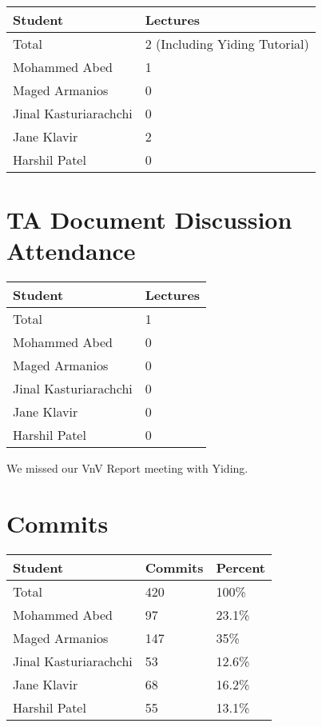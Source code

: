 \documentclass{article}
\begin{document}
\begin{table}[H]
\centering
\begin{tabular}{ll}
\toprule
\textbf{Student} & \textbf{Lectures}\\
\midrule
Total & 2 (Including Yiding Tutorial)\\
Mohammed Abed & 1\\
Maged Armanios & 0\\
Jinal Kasturiarachchi & 0\\
Jane Klavir & 2\\
Harshil Patel & 0\\
\bottomrule
\end{tabular}
\end{table}


\section{TA Document Discussion Attendance}


\begin{table}[H]
\centering
\begin{tabular}{ll}
\toprule
\textbf{Student} & \textbf{Lectures}\\
\midrule
Total & 1\\
Mohammed Abed & 0\\
Maged Armanios & 0\\
Jinal Kasturiarachchi & 0\\
Jane Klavir & 0\\
Harshil Patel & 0\\
\bottomrule
\end{tabular}
\end{table}

We missed our VnV Report meeting with Yiding.
\section{Commits}


\begin{table}[H]
\centering
\begin{tabular}{lll}
\toprule
\textbf{Student} & \textbf{Commits} & \textbf{Percent}\\
\midrule
Total & 420 & 100\% \\
Mohammed Abed & 97 & 23.1\% \\
Maged Armanios & 147 & 35\% \\
Jinal Kasturiarachchi & 53 & 12.6\% \\
Jane Klavir & 68 & 16.2\% \\
Harshil Patel & 55 & 13.1\% \\

\bottomrule
\end{tabular}
\end{table}
\end{document}
